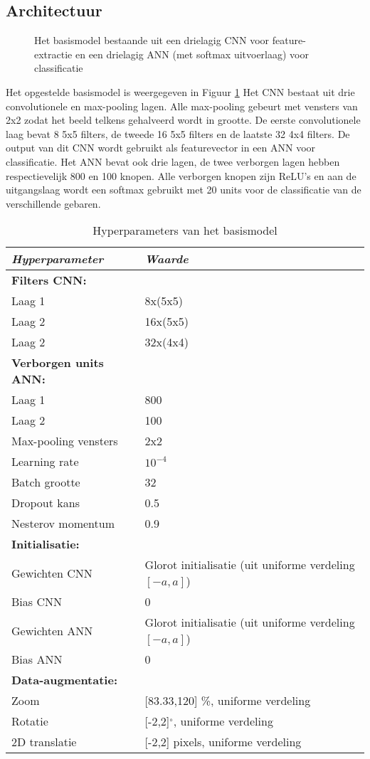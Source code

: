 \subsection{Architectuur}
\begin{figure}[t]
	\centering
	\def\svgwidth{\columnwidth}
	
	\caption{Het basismodel bestaande uit een drielagig CNN voor feature-extractie en een drielagig ANN (met softmax uitvoerlaag) voor classificatie}
	\label{fig:model-1}
\end{figure}
Het opgestelde basismodel is weergegeven in Figuur \ref{fig:model-1}
Het CNN bestaat uit drie convolutionele en max-pooling lagen. Alle max-pooling gebeurt met vensters van 2x2 zodat het beeld telkens gehalveerd wordt in grootte. De eerste convolutionele laag bevat 8 5x5 filters, de tweede 16 5x5 filters en de laatste 32 4x4 filters.
\npar De output van dit CNN wordt gebruikt als featurevector in een ANN voor classificatie. Het ANN bevat ook drie lagen, de twee verborgen lagen hebben respectievelijk 800 en 100 knopen. Alle verborgen knopen zijn ReLU's en aan de uitgangslaag wordt een softmax gebruikt met 20 units voor de classificatie van de verschillende gebaren.
\begin{table}
	\centering
	\renewcommand{\arraystretch}{0.8}%
	\begin{tabular}{ l l }
		\hline
		\textit{Hyperparameter} & \textit{Waarde} \\
		\hline
		\hline
		\textbf{Filters CNN:} & \\
		\quad Laag 1 & 8x(5x5) \\
		\quad Laag 2 & 16x(5x5) \\
		\quad Laag 2 & 32x(4x4) \\
		
		\textbf{Verborgen units ANN:} &\\
		\quad Laag 1 & 800\\
		\quad Laag 2 & 100 \\
		\hline
		Max-pooling vensters & 2x2\\
		Learning rate & $10^{-4}$\\
		Batch grootte & 32\\
		Dropout kans & 0.5\\
		Nesterov momentum & 0.9\\
		\hline
		\textbf{Initialisatie:} & \\
		Gewichten CNN & Glorot initialisatie (uit uniforme verdeling $[-a,a]$)\\
		Bias CNN & 0 \\
		Gewichten ANN & Glorot initialisatie (uit uniforme verdeling $[-a,a]$)\\
		Bias ANN & 0 \\
		\hline
		\textbf{Data-augmentatie:} & \\
		Zoom & [83.33,120] \%, uniforme verdeling \\
		Rotatie & [-2,2]$^{\circ}$, uniforme verdeling\\
		2D translatie & [-2,2] pixels, uniforme verdeling
		
	\end{tabular}	
	\caption{Hyperparameters van het basismodel}\label{tab:hyperparam}
\end{table}
